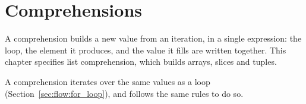 \chapter{Comprehensions}%
\label{chap:compr}

A comprehension builds a new value from an iteration, in a single expression:
the loop, the element it produces, and the value it fills are written together.
This chapter specifies list comprehension, which builds arrays, slices and
tuples.

A comprehension iterates over the same values as a  loop
(Section~\ref{sec:flow:for_loop}), and follows the same rules to do so.

\minitoc%


